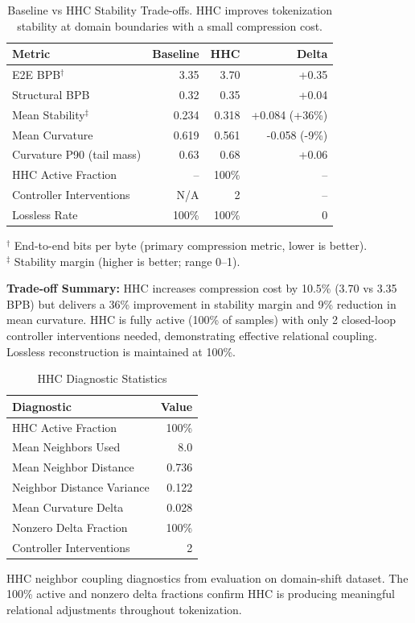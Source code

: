 
\begin{table}[t]
\centering
\caption{Baseline vs HHC Stability Trade-offs. HHC improves tokenization stability
at domain boundaries with a small compression cost.}
\label{tab:hhc-stability}
\begin{tabular}{lrrr}
\toprule
Metric & Baseline & HHC & Delta \\
\midrule
E2E BPB$^\dagger$ & 3.35 & 3.70 & +0.35 \\
Structural BPB & 0.32 & 0.35 & +0.04 \\
Mean Stability$^\ddagger$ & 0.234 & 0.318 & +0.084 (+36\%) \\
Mean Curvature & 0.619 & 0.561 & -0.058 (-9\%) \\
Curvature P90 (tail mass) & 0.63 & 0.68 & +0.06 \\
HHC Active Fraction & -- & 100\% & -- \\
Controller Interventions & N/A & 2 & -- \\
Lossless Rate & 100\% & 100\% & 0 \\
\bottomrule
\end{tabular}

\vspace{0.5em}
\footnotesize{$^\dagger$ End-to-end bits per byte (primary compression metric, lower is better).}\\
\footnotesize{$^\ddagger$ Stability margin (higher is better; range 0--1).}

\vspace{0.5em}
\textbf{Trade-off Summary:} HHC increases compression cost by 10.5\% (3.70 vs 3.35 BPB)
but delivers a 36\% improvement in stability margin and 9\% reduction in mean curvature.
HHC is fully active (100\% of samples) with only 2 closed-loop controller interventions needed,
demonstrating effective relational coupling. Lossless reconstruction is maintained at 100\%.
\end{table}

\begin{table}[h]
\centering
\caption{HHC Diagnostic Statistics}
\label{tab:hhc-diagnostics}
\begin{tabular}{lr}
\toprule
Diagnostic & Value \\
\midrule
HHC Active Fraction & 100\% \\
Mean Neighbors Used & 8.0 \\
Mean Neighbor Distance & 0.736 \\
Neighbor Distance Variance & 0.122 \\
Mean Curvature Delta & 0.028 \\
Nonzero Delta Fraction & 100\% \\
Controller Interventions & 2 \\
\bottomrule
\end{tabular}

\vspace{0.5em}
\footnotesize{HHC neighbor coupling diagnostics from evaluation on domain-shift dataset.
The 100\% active and nonzero delta fractions confirm HHC is producing meaningful
relational adjustments throughout tokenization.}
\end{table}

